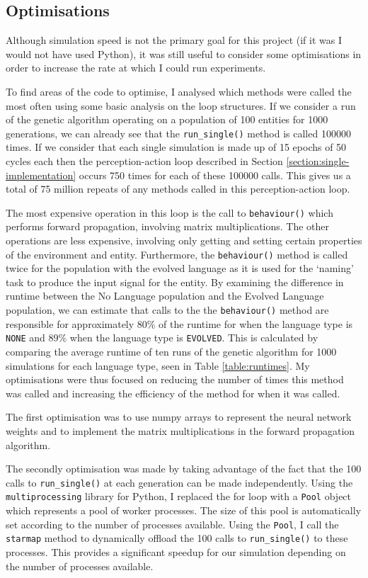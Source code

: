 \documentclass[12pt,a4paper,twoside,openright]{report}
\begin{document}
\subsection{Optimisations}\label{section:optimisations}

Although simulation speed is not the primary goal for this project (if it was I would not have used Python), it was still useful to consider some optimisations in order to increase the rate at which I could run experiments.

To find areas of the code to optimise, I analysed which methods were called the most often using some basic analysis on the loop structures. If we consider a run of the genetic algorithm operating on a population of 100 entities for 1000 generations, we can already see that the \texttt{run\_single()} method is called 100000 times. If we consider that each single simulation is made up of 15 epochs of 50 cycles each then the perception-action loop described in Section \ref{section:single-implementation} occurs 750 times for each of these 100000 calls. This gives us a total of 75 million repeats of any methods called in this perception-action loop.

The most expensive operation in this loop is the call to \texttt{behaviour()} which performs forward propagation, involving matrix multiplications. The other operations are less expensive, involving only getting and setting certain properties of the environment and entity. Furthermore, the \texttt{behaviour()} method is called twice for the population with the evolved language as it is used for the `naming' task to produce the input signal for the entity. By examining the difference in runtime between the No Language population and the Evolved Language population, we can estimate that calls to the the \texttt{behaviour()} method are responsible for approximately 80\% of the runtime for when the language type is \texttt{NONE} and 89\% when the language type is \texttt{EVOLVED}. This is calculated by comparing the average runtime of ten runs of the genetic algorithm for 1000 simulations for each language type, seen in Table \ref{table:runtimes}. My optimisations were thus focused on reducing the number of times this method was called and increasing the efficiency of the method for when it was called.

The first optimisation was to use numpy arrays to represent the neural network weights and to implement the matrix multiplications in the forward propagation algorithm. 

The secondly optimisation was made by taking advantage of the fact that the 100 calls to \texttt{run\_single()} at each generation can be made independently. Using the \texttt{multiprocessing} library for Python, I replaced the for loop with a \texttt{Pool} object which represents a pool of worker processes. The size of this pool is automatically set according to the number of processes available. Using the \texttt{Pool}, I call the \texttt{starmap} method to dynamically offload the 100 calls to \texttt{run\_single()} to these processes. This provides a significant speedup for our simulation depending on the number of processes available. 
\end{document}

